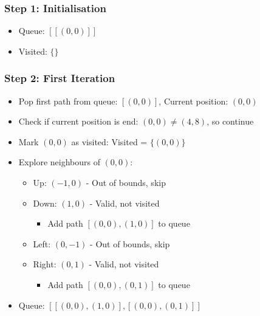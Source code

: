 \subsubsection{Step 1: Initialisation}
\begin{itemize}
    \item Queue: $[[(0,0)]]$
    \item Visited: $\{\}$
\end{itemize}

\subsubsection{Step 2: First Iteration}
\begin{itemize}
    \item Pop first path from queue: $[(0,0)]$, Current position: $(0,0)$
    \item Check if current position is end: $(0,0) \neq (4,8)$, so continue
    \item Mark $(0,0)$ as visited: Visited = $\{(0,0)\}$
    \item Explore neighbours of $(0,0)$:
    \begin{itemize}
        \item Up: $(-1,0)$ - Out of bounds, skip
        \item Down: $(1,0)$ - Valid, not visited
        \begin{itemize}
            \item Add path $[(0,0), (1,0)]$ to queue
        \end{itemize}
        \item Left: $(0,-1)$ - Out of bounds, skip
        \item Right: $(0,1)$ - Valid, not visited
        \begin{itemize}
            \item Add path $[(0,0), (0,1)]$ to queue
        \end{itemize}
    \end{itemize}
    \item Queue: $[[(0,0), (1,0)], [(0,0), (0,1)]]$
\end{itemize}

